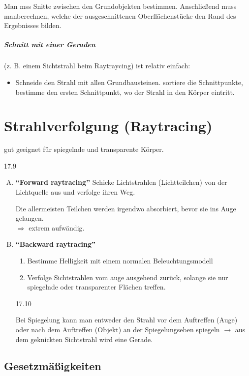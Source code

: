Man mss Snitte zwischen den Grundobjekten bestimmen. Anschließend muss manberechnen, welche der ausgeschnittenen
Oberflächenstücke den Rand des Ergebnisses bilden.

\paragraph*{Schnitt mit einer Geraden} (z. B. einem Sichtstrahl beim Raytraycing) ist relativ einfach:
\begin{itemize}
 \item Schneide den Strahl mit allen Grundbausteinen.
	sortiere die Schnittpunkte, bestimme den ersten Schnittpunkt, wo der Strahl in den Körper eintritt.
\end{itemize}

\chapter{Strahlverfolgung (Raytracing)}
gut geeignet für spiegelnde und transparente Körper.
\begin{center}
 17.9
\end{center}
\begin{enumerate}[A)]
 \item \textbf{"`Forward raytracing"'} Schicke Lichtstrahlen (Lichtteilchen) von der Lichtquelle aus und
	verfolge ihren Weg.
	
	Die allermeisten Teilchen werden irgendwo absorbiert, bevor sie ins Auge gelangen.\\
	$\Rightarrow$ extrem aufwändig.
 \item \textbf{"`Backward raytracing"'}
	\begin{enumerate}[1.]
	\item Bestimme Helligkeit mit einem normalen Beleuchtungsmodell
	\item Verfolge Sichtstrahlen vom auge ausgehend zurück, solange sie nur spiegelnde oder transparenter
		Flächen treffen.
	\end{enumerate}
	\begin{center}
	 17.10
	\end{center}
	Bei Spiegelung kann man entweder den Strahl vor dem Auftreffen (Auge) oder nach dem Auftreffen (Objekt)
	an der Spiegelungseben spiegeln $\rightarrow$ aus dem geknickten Sichtstrahl wird eine Gerade.
\end{enumerate}

\section{Gesetzmäßigkeiten}
